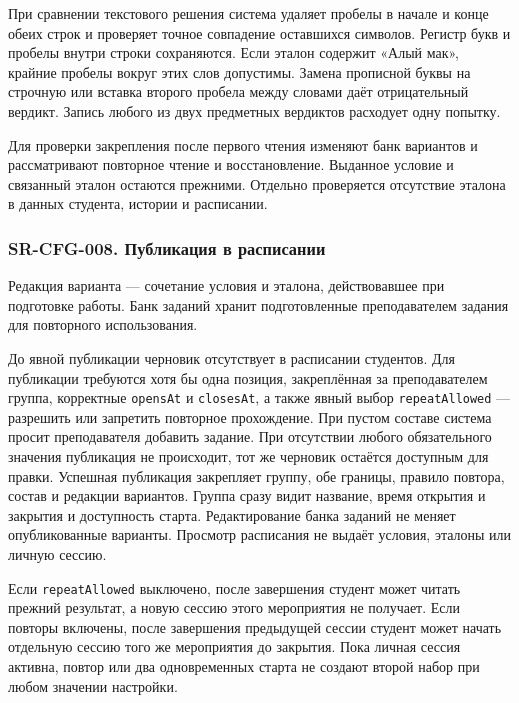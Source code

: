 \documentclass[12pt,a4paper]{article}
\begin{document}
При сравнении текстового решения система удаляет пробелы в начале и конце обеих строк и проверяет точное совпадение оставшихся символов. Регистр букв и пробелы внутри строки сохраняются. Если эталон содержит «Алый мак», крайние пробелы вокруг этих слов допустимы. Замена прописной буквы на строчную или вставка второго пробела между словами даёт отрицательный вердикт. Запись любого из двух предметных вердиктов расходует одну попытку.

Для проверки закрепления после первого чтения изменяют банк вариантов и рассматривают повторное чтение и восстановление. Выданное условие и связанный эталон остаются прежними. Отдельно проверяется отсутствие эталона в данных студента, истории и расписании.

\subsubsection{SR-CFG-008. Публикация в расписании}\label{sr-cfg-008-ux43fux443ux431ux43bux438ux43aux430ux446ux438ux44f-ux432-ux440ux430ux441ux43fux438ux441ux430ux43dux438ux438}

\hypertarget{sr-cfg-008-публикация-в-расписании}{}

\hypertarget{sr-cfg-008}{}

Редакция варианта --- сочетание условия и эталона, действовавшее при подготовке работы. Банк заданий хранит подготовленные преподавателем задания для повторного использования.

До явной публикации черновик отсутствует в расписании студентов. Для публикации требуются хотя бы одна позиция, закреплённая за преподавателем группа, корректные \texttt{opensAt} и \texttt{closesAt}, а также явный выбор \texttt{repeatAllowed} --- разрешить или запретить повторное прохождение. При пустом составе система просит преподавателя добавить задание. При отсутствии любого обязательного значения публикация не происходит, тот же черновик остаётся доступным для правки. Успешная публикация закрепляет группу, обе границы, правило повтора, состав и редакции вариантов. Группа сразу видит название, время открытия и закрытия и доступность старта. Редактирование банка заданий не меняет опубликованные варианты. Просмотр расписания не выдаёт условия, эталоны или личную сессию.

Если \texttt{repeatAllowed} выключено, после завершения студент может читать прежний результат, а новую сессию этого мероприятия не получает. Если повторы включены, после завершения предыдущей сессии студент может начать отдельную сессию того же мероприятия до закрытия. Пока личная сессия активна, повтор или два одновременных старта не создают второй набор при любом значении настройки.
\end{document}
